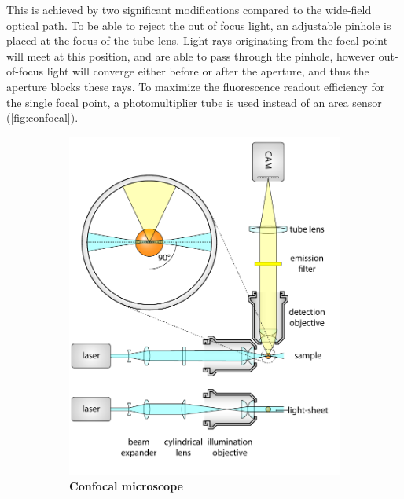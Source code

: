     This is achieved by two significant modifications compared to the wide-field optical path. To be able to reject the out of focus light, an adjustable pinhole is placed at the focus of the tube lens. Light rays originating from the focal point will meet at this position, and are able to pass through the pinhole, however out-of-focus light will converge either before or after the aperture, and thus the aperture blocks these rays. To maximize the fluorescence readout efficiency for the single focal point, a photomultiplier tube is used instead of an area sensor (\autoref{fig:confocal}).

    \begin{figure}[tb]
    \begin{subfigure}[t]{0.49\textwidth}
      \centering
      \includegraphics[page=3,width=\textwidth]{spim_cyl}
      \caption{\textbf{Confocal microscope}}
      \label{fig:confocal}
    \end{subfigure}
    \begin{subfigure}[t]{0.49\textwidth}
      \centering

\end{subfigure}
\end{figure}
